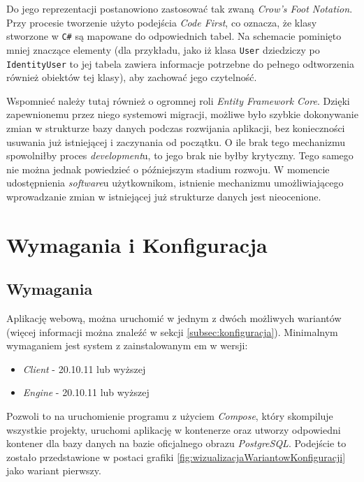 \par Do jego reprezentacji postanowiono zastosować tak zwaną \emph{Crow's Foot Notation}. Przy procesie tworzenie użyto podejścia \emph{Code First}, co oznacza, że klasy stworzone w \texttt{C\#} są mapowane do odpowiednich tabel. Na schemacie pominięto mniej znaczące elementy (dla przykładu, jako iż klasa \texttt{User} dziedziczy po \texttt{IdentityUser} to jej tabela zawiera informacje potrzebne do pełnego odtworzenia również obiektów tej klasy), aby zachować jego czytelność.

\par Wspomnieć należy tutaj również o ogromnej roli \emph{Entity Framework Core}. Dzięki zapewnionemu przez niego systemowi migracji, możliwe było szybkie dokonywanie zmian w strukturze bazy danych podczas rozwijania aplikacji, bez konieczności usuwania już istniejącej i zaczynania od początku. O ile brak tego mechanizmu spowolniłby proces \emph{development}u, to jego brak nie byłby krytyczny. Tego samego nie można jednak powiedzieć o późniejszym stadium rozwoju. W momencie udostępnienia \emph{software}u użytkownikom, istnienie mechanizmu umożliwiającego wprowadzanie zmian w istniejącej już strukturze danych jest nieocenione.

\section{Wymagania i Konfiguracja}
\label{sec:wymaganiaIKonfiguracja}

\subsection{Wymagania}
\par Aplikację webową, można uruchomić w jednym z dwóch możliwych wariantów (więcej informacji można znaleźć w sekcji \ref{subsec:konfiguracja}). Minimalnym wymaganiem jest system z zainstalowanym \emph{\docker}em w wersji:

\begin{itemize}
	\item \emph{\docker{} Client} - 20.10.11 lub wyższej
	\item \emph{\docker{} Engine} - 20.10.11 lub wyższej
\end{itemize}

\par Pozwoli to na uruchomienie programu z użyciem \emph{\docker{} Compose}, który skompiluje wszystkie projekty, uruchomi aplikację w kontenerze oraz utworzy odpowiedni kontener dla bazy danych na bazie oficjalnego obrazu \emph{PostgreSQL}. Podejście to zostało przedstawione w postaci grafiki \ref{fig:wizualizacjaWariantowKonfiguracji} jako wariant pierwszy.

